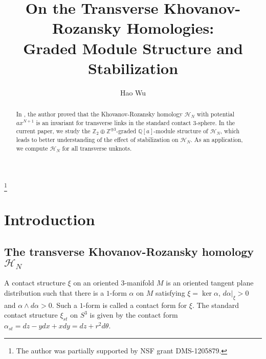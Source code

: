 \documentclass{amsart}
\theoremstyle{plain}
\theoremstyle{definition}
\theoremstyle{remark}
\numberwithin{equation}{section}
\begin{document}
\title[Transverse Khovanov-Rozansky Homologies]{On the Transverse Khovanov-Rozansky Homologies: \\ Graded Module Structure and Stabilization}

\author{Hao Wu}

\thanks{The author was partially supported by NSF grant DMS-1205879.}

\address{Department of Mathematics, The George Washington University, Monroe Hall, Room 240, 2115 G Street, NW, Washington DC 20052, USA. Telephone: 1-202-994-0653, Fax: 1-202-994-6760}




\begin{abstract}
In \cite{Wu-triple-trans}, the author proved that the Khovanov-Rozansky homology $\mathcal{H}_N$ with potential $ax^{N+1}$ is an invariant for transverse links in the standard contact $3$-sphere. In the current paper, we study the ${\mathbb{Z}}_2\oplus{\mathbb{Z}}^{\oplus 3}$-graded ${\mathbb{Q}}[a]$-module structure of $\mathcal{H}_N$, which leads to better understanding of the effect of stabilization on $\mathcal{H}_N$. As an application, we compute $\mathcal{H}_N$ for all transverse unknots.
\end{abstract}

\maketitle

\section{Introduction}\label{sec-intro}

\subsection{The transverse Khovanov-Rozansky homology $\mathcal{H}_N$}

A contact structure $\xi$ on an oriented $3$-manifold $M$ is an oriented tangent plane distribution such that there is a $1$-form $\alpha$ on $M$ satisfying $\xi=\ker\alpha$, $d\alpha|_{\xi}>0$ and $\alpha\wedge d\alpha>0$. Such a $1$-form is called a contact form for $\xi$. The standard contact structure $\xi_{st}$ on $S^3$ is given by the contact form $\alpha_{st} = dz-ydx+xdy=dz+r^2d\theta$. 
\end{document}

